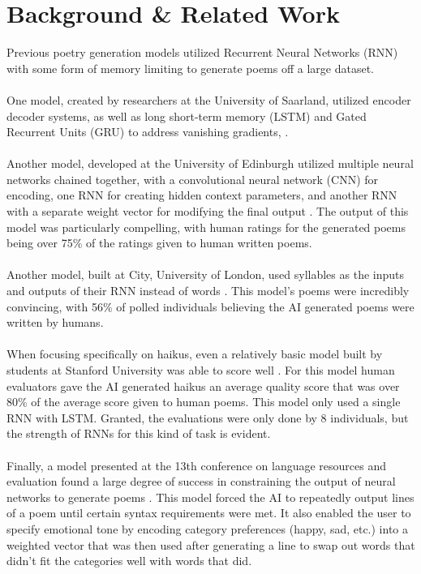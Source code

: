 \documentclass{article} %
\begin{document}
\section{Background \& Related Work}
Previous poetry generation models utilized Recurrent Neural Networks (RNN) with some form of memory limiting to generate poems off a large dataset.\\\\
One model, created by researchers at the University of Saarland, utilized encoder decoder systems, as well as long short-term memory (LSTM) and Gated Recurrent Units (GRU) to address vanishing gradients, \citep{novikovaenglish}.\\\\
Another model, developed at the University of Edinburgh utilized multiple neural networks chained together, with a convolutional neural network (CNN) for encoding, one RNN for creating hidden context parameters,
and another RNN with a separate weight vector for modifying the final output \citep{zhang2014chinese}.
The output of this model was particularly compelling, with human ratings for the generated poems being over 75\% of the ratings given to human written poems.\\\\
Another model, built at City, University of London, used syllables as the inputs and outputs of their RNN instead of words \citep{lewis2021syllable}.
This model’s poems were incredibly convincing, with 56\% of polled individuals believing the AI generated poems were written by humans.\\\\
When focusing specifically on haikus, even a relatively basic model built by students at Stanford University was able to score well \citep{haikugeneration}. 
For this model human evaluators gave the AI generated haikus an average quality score that was over 80\% of the average score given to human poems. This model only used a single RNN with LSTM. 
Granted, the evaluations were only done by 8 individuals, but the strength of RNNs for this kind of task is evident.\\\\
Finally, a model presented at the 13th conference on language resources and evaluation found a large degree of success in constraining the output of neural networks to generate poems \citep{popescu2022constrained}.
This model forced the AI to repeatedly output lines of a poem until certain syntax requirements were met. 
It also enabled the user to specify emotional tone by encoding category preferences (happy, sad, etc.) into a weighted vector that was then used after generating a line to swap out words that didn’t fit the categories well with words that did.\\\\
\end{document}
